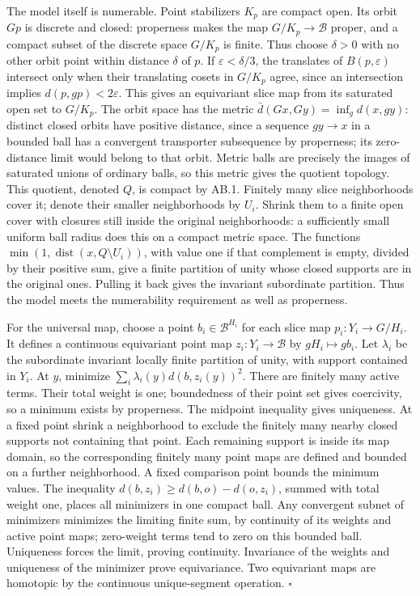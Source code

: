 \documentclass[
  11pt,
]{article}
\begin{document}
The model itself is numerable. Point stabilizers \(K_p\) are compact
open. Its orbit \(Gp\) is discrete and closed: properness makes the map
\(G/K_p\to\mathcal B\) proper, and a compact subset of the discrete
space \(G/K_p\) is finite. Thus choose \(\delta>0\) with no other orbit
point within distance \(\delta\) of \(p\). If \(\varepsilon<\delta/3\),
the translates of \(B(p,\varepsilon)\) intersect only when their
translating cosets in \(G/K_p\) agree, since an intersection implies
\(d(p,gp)<2\varepsilon\). This gives an equivariant slice map from its
saturated open set to \(G/K_p\). The orbit space has the metric
\(\bar d(Gx,Gy)=\inf_gd(x,gy)\): distinct closed orbits have positive
distance, since a sequence \(gy\to x\) in a bounded ball has a
convergent transporter subsequence by properness; its zero-distance
limit would belong to that orbit. Metric balls are precisely the images
of saturated unions of ordinary balls, so this metric gives the quotient
topology. This quotient, denoted \(Q\), is compact by AB.1. Finitely
many slice neighborhoods cover it; denote their smaller neighborhoods by
\(U_i\). Shrink them to a finite open cover with closures still inside
the original neighborhoods: a sufficiently small uniform ball radius
does this on a compact metric space. The functions
\(\min(1,\operatorname{dist}(x,Q\setminus U_i))\), with value one if
that complement is empty, divided by their positive sum, give a finite
partition of unity whose closed supports are in the original ones.
Pulling it back gives the invariant subordinate partition. Thus the
model meets the numerability requirement as well as properness.

For the universal map, choose a point \(b_i\in\mathcal B^{H_i}\) for
each slice map \(p_i:Y_i\to G/H_i\). It defines a continuous equivariant
point map \(z_i:Y_i\to\mathcal B\) by \(gH_i\mapsto gb_i\). Let
\(\lambda_i\) be the subordinate invariant locally finite partition of
unity, with support contained in \(Y_i\). At \(y\), minimize
\(\sum_i\lambda_i(y)d(b,z_i(y))^2\). There are finitely many active
terms. Their total weight is one; boundedness of their point set gives
coercivity, so a minimum exists by properness. The midpoint inequality
gives uniqueness. At a fixed point shrink a neighborhood to exclude the
finitely many nearby closed supports not containing that point. Each
remaining support is inside its map domain, so the corresponding
finitely many point maps are defined and bounded on a further
neighborhood. A fixed comparison point bounds the minimum values. The
inequality \(d(b,z_i)\ge d(b,o)-d(o,z_i)\), summed with total weight
one, places all minimizers in one compact ball. Any convergent subnet of
minimizers minimizes the limiting finite sum, by continuity of its
weights and active point maps; zero-weight terms tend to zero on this
bounded ball. Uniqueness forces the limit, proving continuity.
Invariance of the weights and uniqueness of the minimizer prove
equivariance. Two equivariant maps are homotopic by the continuous
unique-segment operation. \(\square\)
\end{document}
